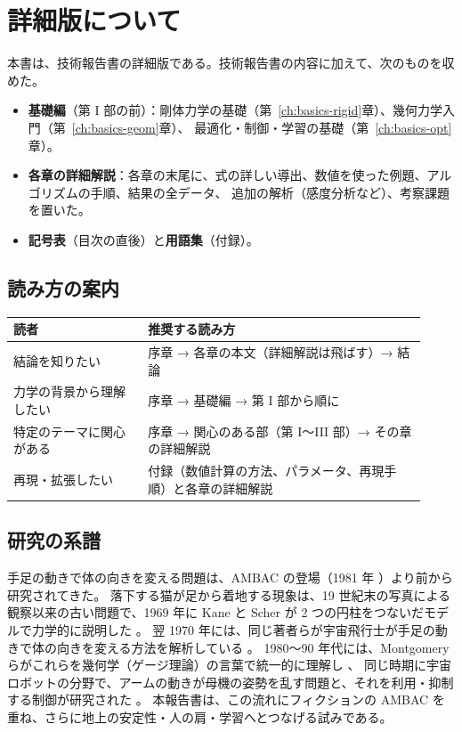 \section{詳細版について}

本書は、技術報告書の詳細版である。技術報告書の内容に加えて、次のものを収めた。

\begin{itemize}
\item \textbf{基礎編}（第 I 部の前）：剛体力学の基礎（第~\ref{ch:basics-rigid}章）、幾何力学入門（第~\ref{ch:basics-geom}章）、
  最適化・制御・学習の基礎（第~\ref{ch:basics-opt}章）。
\item \textbf{各章の詳細解説}：各章の末尾に、式の詳しい導出、数値を使った例題、アルゴリズムの手順、結果の全データ、
  追加の解析（感度分析など）、考察課題を置いた。
\item \textbf{記号表}（目次の直後）と\textbf{用語集}（付録）。
\end{itemize}

\subsection{読み方の案内}

\begin{longtable}{p{0.30\linewidth}p{0.62\linewidth}}
\toprule
読者 & 推奨する読み方 \\ \midrule \endhead
結論を知りたい & 序章 → 各章の本文（詳細解説は飛ばす）→ 結論 \\
力学の背景から理解したい & 序章 → 基礎編 → 第 I 部から順に \\
特定のテーマに関心がある & 序章 → 関心のある部（第 I〜III 部）→ その章の詳細解説 \\
再現・拡張したい & 付録（数値計算の方法、パラメータ、再現手順）と各章の詳細解説 \\
\bottomrule
\end{longtable}

\subsection{研究の系譜}

手足の動きで体の向きを変える問題は、AMBAC の登場（1981 年 \cite{R42}）より前から研究されてきた。
落下する猫が足から着地する現象は、19 世紀末の写真による観察以来の古い問題で、1969 年に Kane と Scher が 2 つの円柱をつないだモデルで力学的に説明した \cite{R7}。
翌 1970 年には、同じ著者らが宇宙飛行士が手足の動きで体の向きを変える方法を解析している \cite{R8}。
1980〜90 年代には、Montgomery らがこれらを幾何学（ゲージ理論）の言葉で統一的に理解し \cite{R4}、
同じ時期に宇宙ロボットの分野で、アームの動きが母機の姿勢を乱す問題と、それを利用・抑制する制御が研究された \cite{R12,R13,R14,R15}。
本報告書は、この流れにフィクションの AMBAC を重ね、さらに地上の安定性・人の肩・学習へとつなげる試みである。
